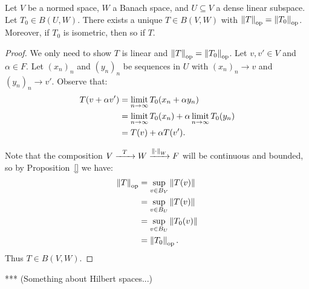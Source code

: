     \begin{corollary}
        Let $V$ be a normed space, $W$ a Banach space, and $U \subseteq V$ a dense linear subspace. Let $T_0 \in B(U,W)$. There exists a unique $T \in B(V,W)$ with $\lnorm T \rnorm_{\op} = \lnorm T_0 \rnorm_{\op}$. Moreover, if $T_0$ is isometric, then so if $T$.
    \end{corollary}
        \begin{proof}
            We only need to show $T$ is linear and $\lnorm T \rnorm_{\op} = \lnorm T_0 \rnorm_{\op}$. Let $v,v' \in V$ and $\alpha \in F$. Let $(x_n)_n$ and $(y_n)_n$ be sequences in $U$ with $(x_n)_n \rightarrow v$ and $(y_n)_n \rightarrow v'$. Observe that:
                \begin{equation*}
                \begin{split}
                    T(v + \alpha v')
                    & = \limit_{n \rightarrow \infty} T_0(x_n + \alpha y_n) \\
                    & = \limit_{n \rightarrow \infty} T_0(x_n) + \alpha \limit_{n \rightarrow \infty} T_0(y_n) \\
                    & = T(v) + \alpha T(v').
                \end{split}
                \end{equation*}
            
            Note that the composition $V \xrightarrow{\h6T\h6} W \xrightarrow{\lnorm \cdot \rnorm_W} F$ will be continuous and bounded, so by Proposition~\ref{} we have:
                \begin{equation*}
                \begin{split}
                   \lnorm T \rnorm_{\op} 
                   & = \sup_{v \in B_V}\lnorm T(v) \rnorm \\
                   & = \sup_{v \in B_U}\lnorm T(v) \rnorm \\
                   & = \sup_{v \in B_U}\lnorm T_0(v) \rnorm \\
                   & = \lnorm T_0 \rnorm_{\op}.
                \end{split}
                \end{equation*}
            Thus $T \in B(V,W)$.
        \end{proof}

    \begin{example}***
        (Something about Hilbert spaces...)
    \end{example}

